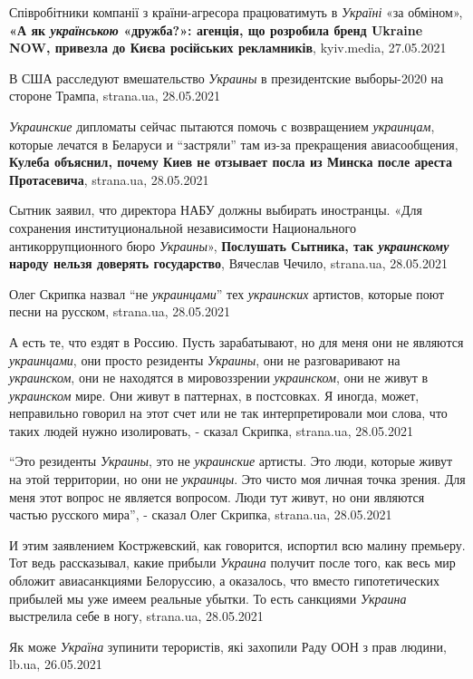 Співробітники компанії з країни-агресора працюватимуть в \emph{Україні} «за
обміном», \textbf{«А як \emph{українською} «дружба?»: агенція, що розробила бренд
Ukraine NOW, привезла до Києва російських рекламників}, kyiv.media, 27.05.2021

В США расследуют вмешательство \emph{Украины} в президентские выборы-2020 на
стороне Трампа, strana.ua, 28.05.2021

\emph{Украинские} дипломаты сейчас пытаются помочь с возвращением \emph{украинцам}, которые
лечатся в Беларуси и \enquote{застряли} там из-за прекращения авиасообщения,
\textbf{Кулеба объяснил, почему Киев не отзывает посла из Минска после ареста
Протасевича}, strana.ua, 28.05.2021

Сытник заявил, что директора НАБУ должны выбирать иностранцы. «Для сохранения
институциональной независимости Национального антикоррупционного бюро
\emph{Украины}», \textbf{Послушать Сытника, так \emph{украинскому} народу
нельзя доверять государство}, Вячеслав Чечило, strana.ua, 28.05.2021

Олег Скрипка назвал \enquote{не \emph{украинцами}} тех \emph{украинских}
артистов, которые поют песни на русском, strana.ua, 28.05.2021

А есть те, что ездят в Россию. Пусть зарабатывают, но для меня они не являются
\emph{украинцами}, они просто резиденты \emph{Украины}, они не разговаривают на \emph{украинском},
они не находятся в мировоззрении \emph{украинском}, они не живут в \emph{украинском} мире.
Они живут в паттернах, в постсовках. Я иногда, может, неправильно говорил на
этот счет или не так интерпретировали мои слова, что таких людей нужно
изолировать, - сказал Скрипка, strana.ua, 28.05.2021

\enquote{Это резиденты \emph{Украины}, это не \emph{украинские} артисты. Это
люди, которые живут на этой территории, но они не \emph{украинцы}. Это чисто
моя личная точка зрения. Для меня этот вопрос не является вопросом. Люди тут
живут, но они являются частью русского мира}, - сказал Олег Скрипка, strana.ua,
28.05.2021

И этим заявлением Костржевский, как говорится, испортил всю малину премьеру.
Тот ведь рассказывал, какие прибыли \emph{Украина} получит после того, как весь мир
обложит авиасанкциями Белоруссию, а оказалось, что вместо гипотетических
прибылей мы уже имеем реальные убытки. То есть санкциями \emph{Украина} выстрелила
себе в ногу, strana.ua, 28.05.2021

Як може \emph{Україна} зупинити терористів, які захопили Раду ООН з прав
людини, lb.ua, 26.05.2021

